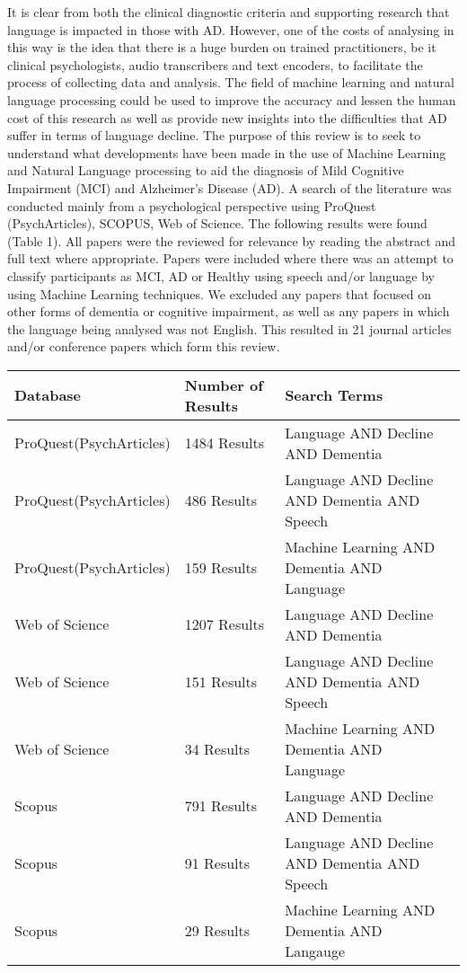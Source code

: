 \documentclass[a4paper]{article}
\begin{document}
It is clear from both the clinical diagnostic criteria and supporting research that language is impacted in those with AD. However, one of the costs of analysing in this way is the idea that there is a huge burden on trained practitioners, be it clinical psychologists, audio transcribers and text encoders, to facilitate the process of collecting data and analysis. The field of machine learning and natural language processing could be used to improve the accuracy and lessen the human cost of this research as well as provide new insights into the difficulties that AD suffer in terms of language decline.  
The purpose of this review is to seek to understand what developments have been made in the use of Machine Learning and Natural Language processing to aid the diagnosis of Mild Cognitive Impairment (MCI) and Alzheimer's Disease (AD). A search of the literature was conducted mainly from a psychological perspective using ProQuest (PsychArticles), SCOPUS, Web of Science. The following results were found (Table 1). All papers were the reviewed for relevance by reading the abstract and full text where appropriate. Papers were included where there was an attempt to classify participants as MCI, AD or Healthy using speech and/or language by using Machine Learning techniques. We excluded any papers that focused on other forms of dementia or cognitive impairment, as well as any papers in which the language being analysed was not English. This resulted in 21 journal articles and/or conference papers which form this review.

\begin{center}
	\begin{tabular}{ | l | l | l | p{3cm} |}
		\hline
		Database & Number of Results & Search Terms  \\ \hline
		ProQuest(PsychArticles) & 1484 Results & Language AND Decline AND Dementia \\ \hline
		ProQuest(PsychArticles) & 486 Results  & Language AND Decline AND Dementia AND Speech \\ \hline
		ProQuest(PsychArticles) & 159 Results & Machine Learning AND Dementia AND Language \\ \hline
		Web of Science & 1207 Results  & Language AND Decline AND Dementia   \\ \hline
		Web of Science & 151 Results  & Language AND Decline AND Dementia AND Speech  \\ \hline
		Web of Science & 34 Results & Machine Learning AND Dementia AND Language \\ \hline
		Scopus & 791 Results & Language AND Decline AND Dementia  \\ \hline
		Scopus & 91 Results & Language AND Decline AND Dementia AND Speech   \\ \hline
		Scopus & 29 Results & Machine Learning AND Dementia AND Langauge \\ \hline
		
	\end{tabular}
\end{center}
\end{document}

